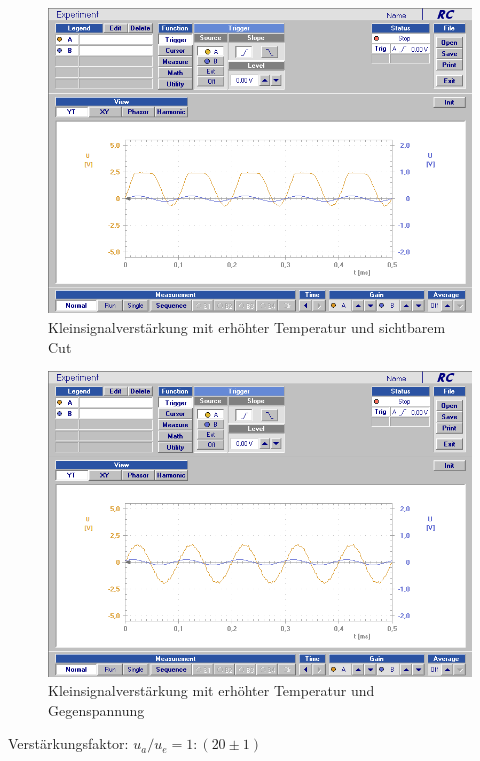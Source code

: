 \documentclass[12pt,a4paper]{article}
\begin{document}
\begin{figure}[H]
	\centering
	\includegraphics[scale=0.45]{./data/Braun_Kurz_PS8/Kleinsignalverstaerkung_Temp_Cut.png}
	\caption{Kleinsignalverstärkung mit erhöhter Temperatur und sichtbarem Cut}
	\label{fig:kleinsignalverstaerkung_temp_cut}
\end{figure}


\begin{figure}[H]
	\centering
	\includegraphics[scale=0.45]{./data/Braun_Kurz_PS8/Kleinsignalverstaerkung_Temp_Gegenspannung.png}
	\caption{Kleinsignalverstärkung mit erhöhter Temperatur und Gegenspannung}
	\label{fig:kleinsignalverstaerkung_temp_gegen}
\end{figure}

Verstärkungsfaktor: $u_a/u_e= 1: (20 \pm 1)$
\end{document}
